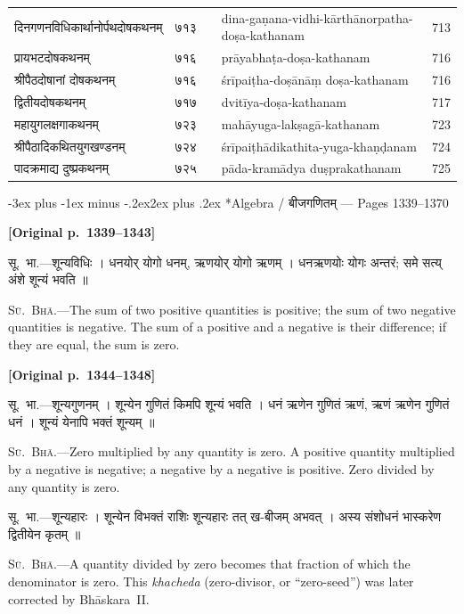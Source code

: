 \documentclass[11pt,a4paper]{article}
\makeatletter
\renewcommand{\section}{\@startsection {section}{1}{\z@}%
  {-3ex plus -1ex minus -.2ex}{2ex plus .2ex}%
  {\normalfont\Large\bfseries\color{sectioncolor}}}
\newcommand{\dev}[1]{{\devanagarifont\mdseries\upshape #1}}
\newcommand{\pagelabel}[1]{\textcolor{sectioncolor}{\textbf{[Original p.~#1]}}}
\newcommand{\bilingualpair}[2]{%
  \noindent%
  \begin{minipage}[t]{0.47\textwidth}
    \begin{flushleft}
      \small\dev{#1}
    \end{flushleft}
  \end{minipage}%
  \hfill\vrule\hfill%
  \begin{minipage}[t]{0.47\textwidth}
    \begin{flushleft}
      \small #2
    \end{flushleft}
  \end{minipage}%
  \par\vspace{1.2ex}
}
\makeatother
\begin{document}
\begin{minipage}{\textwidth}
\begin{longtable}{p{}rp{}p{}r}
\dev{दिनगणनविधिकार्थानोर्पथदोषकथनम्} & ७१३ && dina-gaṇana-vidhi-kārthānorpatha-doṣa-kathanam & 713 \\
\dev{प्रायभटदोषकथनम्} & ७१६ && prāyabhaṭa-doṣa-kathanam & 716 \\
\dev{श्रीपैठदोषानां दोषकथनम्} & ७१६ && śrīpaiṭha-doṣānāṃ doṣa-kathanam & 716 \\
\dev{द्वितीयदोषकथनम्} & ७१७ && dvitīya-doṣa-kathanam & 717 \\
\dev{महायुगलक्षगाकथनम्} & ७२३ && mahāyuga-lakṣagā-kathanam & 723 \\
\dev{श्रीपैठादिकथितयुगखण्डनम्} & ७२४ && śrīpaiṭhādikathita-yuga-khaṇḍanam & 724 \\
\dev{पादक्रमाद्य दुष्प्रकथनम्} & ७२५ && pāda-kramādya duṣprakathanam & 725 \\
\bottomrule
\end{longtable}
\end{minipage}

\newpage

\section*{Algebra / \dev{बीजगणितम्} --- Pages 1339--1370}

\pagelabel{1339--1343}

\bilingualpair{%
सू.~भा.---शून्यविधिः । धनयोर् योगो धनम्, ऋणयोर् योगो ऋणम् । धनऋणयोः योगः अन्तरं; समे सत्य् अंशे शून्यं भवति ॥
}{%
\textsc{Sū.~Bhā.}---The sum of two positive quantities is positive; the sum of two negative quantities is negative. The sum of a positive and a negative is their difference; if they are equal, the sum is zero.
}

\vspace{0.5ex}
\pagelabel{1344--1348}

\bilingualpair{%
सू.~भा.---शून्यगुणनम् । शून्येन गुणितं किमपि शून्यं भवति । धनं ऋणेन गुणितं ऋणं, ऋणं ऋणेन गुणितं धनं । शून्यं येनापि भक्तं शून्यम् ॥
}{%
\textsc{Sū.~Bhā.}---Zero multiplied by any quantity is zero. A positive quantity multiplied by a negative is negative; a negative by a negative is positive. Zero divided by any quantity is zero.
}

\bilingualpair{%
सू.~भा.---शून्यहारः । शून्येन विभक्तं राशिः शून्यहारः तत् ख-बीजम् अभवत् । अस्य संशोधनं भास्करेण द्वितीयेन कृतम् ॥
}{%
\textsc{Sū.~Bhā.}---A quantity divided by zero becomes that fraction of which the denominator is zero. This \textit{khacheda} (zero-divisor, or ``zero-seed'') was later corrected by Bhāskara~II.
}
\end{document}

